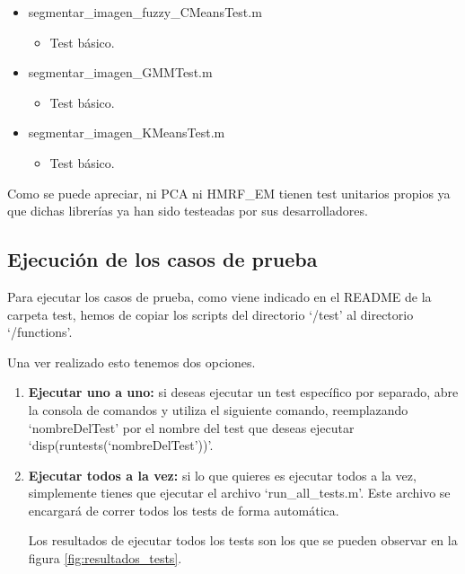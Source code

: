 \begin{itemize}
    \item segmentar\_imagen\_fuzzy\_CMeansTest.m
    \begin{itemize}
        \item Test básico.
    \end{itemize}
    \item segmentar\_imagen\_GMMTest.m
    \begin{itemize}
        \item Test básico.
    \end{itemize}
    \item segmentar\_imagen\_KMeansTest.m
    \begin{itemize}
        \item Test básico.
    \end{itemize}
\end{itemize}

Como se puede apreciar, ni PCA ni HMRF\_EM tienen test unitarios propios ya que dichas librerías ya han sido testeadas por sus desarrolladores.

\subsection{Ejecución de los casos de prueba}\label{ejecución-de-los-casos-de-prueba}

Para ejecutar los casos de prueba, como viene indicado en el README de la carpeta test, hemos de copiar los scripts del directorio `/test' al directorio `/functions'.

Una ver realizado esto tenemos dos opciones.
\begin{enumerate}
    \item \textbf{Ejecutar uno a uno:} si deseas ejecutar un test específico por separado, abre la consola de comandos y utiliza el siguiente comando, reemplazando `nombreDelTest' por el nombre del test que deseas ejecutar `disp(runtests(`nombreDelTest'))'.
    \item \textbf{Ejecutar todos a la vez:} si lo que quieres es ejecutar todos a la vez, simplemente tienes que ejecutar el archivo `run\_all\_tests.m'. Este archivo se encargará de correr todos los tests de forma automática.
    
    Los resultados de ejecutar todos los tests son los que se pueden observar en la figura \ref{fig:resultados_tests}.
\end{enumerate}

